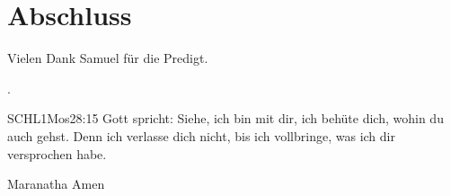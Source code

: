 \documentclass{../../inc/mybib}
\begin{document}
\section{Abschluss}
Vielen Dank Samuel für die Predigt.

.

\beten{}

\begin{bibelbox}{SCHL}{1Mos}{28:15}
    Gott spricht: Siehe, ich bin mit dir,
    ich behüte dich, wohin du auch gehst.
    Denn ich verlasse dich nicht,
    bis ich vollbringe, was ich dir versprochen habe.
\end{bibelbox}

Maranatha Amen
\end{document}
